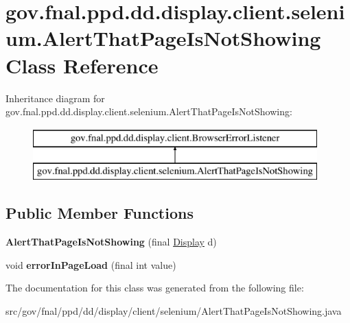 \hypertarget{classgov_1_1fnal_1_1ppd_1_1dd_1_1display_1_1client_1_1selenium_1_1AlertThatPageIsNotShowing}{\section{gov.\-fnal.\-ppd.\-dd.\-display.\-client.\-selenium.\-Alert\-That\-Page\-Is\-Not\-Showing Class Reference}
\label{classgov_1_1fnal_1_1ppd_1_1dd_1_1display_1_1client_1_1selenium_1_1AlertThatPageIsNotShowing}
}
Inheritance diagram for gov.\-fnal.\-ppd.\-dd.\-display.\-client.\-selenium.\-Alert\-That\-Page\-Is\-Not\-Showing\-:\begin{figure}[H]
\begin{center}
\leavevmode
\includegraphics[height=2.000000cm]{classgov_1_1fnal_1_1ppd_1_1dd_1_1display_1_1client_1_1selenium_1_1AlertThatPageIsNotShowing}
\end{center}
\end{figure}
\subsection*{Public Member Functions}
\begin{DoxyCompactItemize}
\item 
\hypertarget{classgov_1_1fnal_1_1ppd_1_1dd_1_1display_1_1client_1_1selenium_1_1AlertThatPageIsNotShowing_a4f9d56ae893432d34ccce59a15af49c1}{{\bfseries Alert\-That\-Page\-Is\-Not\-Showing} (final \hyperlink{interfacegov_1_1fnal_1_1ppd_1_1dd_1_1signage_1_1Display}{Display} d)}\label{classgov_1_1fnal_1_1ppd_1_1dd_1_1display_1_1client_1_1selenium_1_1AlertThatPageIsNotShowing_a4f9d56ae893432d34ccce59a15af49c1}

\item 
\hypertarget{classgov_1_1fnal_1_1ppd_1_1dd_1_1display_1_1client_1_1selenium_1_1AlertThatPageIsNotShowing_a2830890a7364d6ce4a328cda1a784fa0}{void {\bfseries error\-In\-Page\-Load} (final int value)}\label{classgov_1_1fnal_1_1ppd_1_1dd_1_1display_1_1client_1_1selenium_1_1AlertThatPageIsNotShowing_a2830890a7364d6ce4a328cda1a784fa0}

\end{DoxyCompactItemize}


The documentation for this class was generated from the following file\-:\begin{DoxyCompactItemize}
\item 
src/gov/fnal/ppd/dd/display/client/selenium/Alert\-That\-Page\-Is\-Not\-Showing.\-java\end{DoxyCompactItemize}
